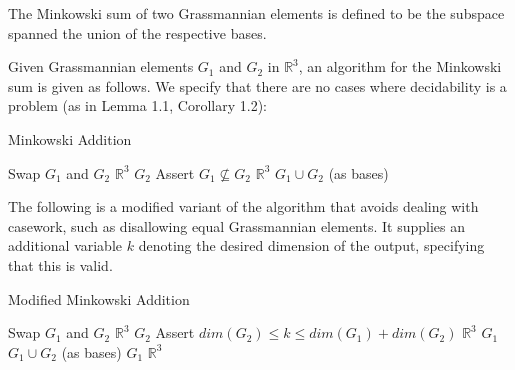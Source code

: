 \documentclass[12pt]{article}
\newcommand{\R}{\mathbb{R}}
\newenvironment{definition}[2][Definition]{\begin{trivlist}
\item[\hskip \labelsep {\bfseries #1}\hskip \labelsep {\bfseries #2.}]}{\end{trivlist}}
\newenvironment{proposition}[2][Proposition]{\begin{trivlist}
\item[\hskip \labelsep {\bfseries #1}\hskip \labelsep {\bfseries #2.}]}{\end{trivlist}}
\begin{document}
\begin{definition}{2.1}
The Minkowski sum of two Grassmannian elements is defined to be the subspace spanned the union of the respective bases.
\end{definition}

\begin{proposition}{2.2}
Given Grassmannian elements \(G_1\) and \(G_2\) in \(\R^3\), an algorithm for the Minkowski sum is given as follows. We specify that there are no cases where decidability is a problem (as in Lemma 1.1, Corollary 1.2):

\begin{algorithm}[H]
\caption{Minkowski Addition}
\begin{algorithmic}[1]
\State Swap $G_1$ and $G_2$
\EndIf
{}
\Return $\R^3$
\Return $G_2$
\EndIf
\State Assert $G_1 \not\subseteq G_2$
\Return $\R^3$
\Return $G_1 \cup G_2$ (as bases)
\Else{
\Return $\R^3$
}
\EndIf
\EndProcedure
\end{algorithmic}
\end{algorithm}

\end{proposition}

\begin{proposition}{2.3}
The following is a modified variant of the algorithm that avoids dealing with casework, such as disallowing equal Grassmannian elements. It supplies an additional variable \(k\) denoting the desired dimension of the output, specifying that this is valid.

\begin{algorithm}[H]
\caption{Modified Minkowski Addition}
\begin{algorithmic}[2]
\State Swap $G_1$ and $G_2$
\EndIf
{}
\Return $\R^3$
\Return $G_2$
\EndIf
\State Assert $dim(G_2) \leq k \leq dim(G_1) + dim(G_2)$
\Return $\R^3$
\Return $G_1$
\Return $G_1 \cup G_2$ (as bases)
\Return $G_1$
\Return $\R^3$
\EndIf
\EndProcedure
\end{algorithmic}
\end{algorithm}

\end{proposition}
\end{document}
